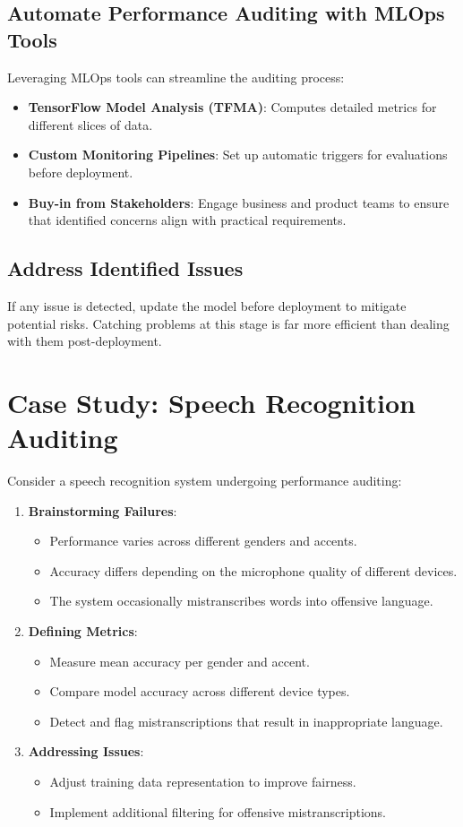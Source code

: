 \documentclass[12pt,openany, draft]{book}
\begin{document}
\subsection{Automate Performance Auditing with MLOps Tools}
Leveraging MLOps tools can streamline the auditing process:
\begin{itemize}
    \item \textbf{TensorFlow Model Analysis (TFMA)}: Computes detailed metrics for different slices of data.
    \item \textbf{Custom Monitoring Pipelines}: Set up automatic triggers for evaluations before deployment.
    \item \textbf{Buy-in from Stakeholders}: Engage business and product teams to ensure that identified concerns align with practical requirements.
\end{itemize}

\subsection{Address Identified Issues}
If any issue is detected, update the model before deployment to mitigate potential risks. Catching problems at this stage is far more efficient than dealing with them post-deployment.

\section{Case Study: Speech Recognition Auditing}
Consider a speech recognition system undergoing performance auditing:
\begin{enumerate}
    \item \textbf{Brainstorming Failures}:
    \begin{itemize}
        \item Performance varies across different genders and accents.
        \item Accuracy differs depending on the microphone quality of different devices.
        \item The system occasionally mistranscribes words into offensive language.
    \end{itemize}
    \item \textbf{Defining Metrics}:
    \begin{itemize}
        \item Measure mean accuracy per gender and accent.
        \item Compare model accuracy across different device types.
        \item Detect and flag mistranscriptions that result in inappropriate language.
    \end{itemize}
    \item \textbf{Addressing Issues}:
    \begin{itemize}
        \item Adjust training data representation to improve fairness.
        \item Implement additional filtering for offensive mistranscriptions.
    \end{itemize}
\end{enumerate}
\end{document}
